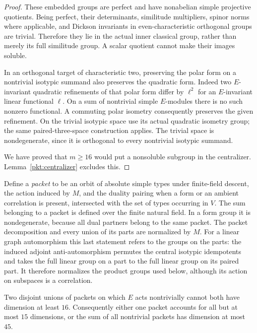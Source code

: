 \begin{proof}
These embedded groups are perfect and have nonabelian simple
projective quotients.  Being perfect, their determinants,
similitude multipliers, spinor norms where applicable, and
Dickson invariants in even-characteristic orthogonal groups
are trivial.  Therefore
they lie in the actual inner classical group, rather than
merely its full similitude group.  A scalar quotient cannot
make their images soluble.

In an orthogonal target of characteristic two, preserving the
polar form on a nontrivial isotypic summand also preserves the
quadratic form.  Indeed two $E$-invariant quadratic refinements
of that polar form differ by $\ell^2$ for an $E$-invariant linear
functional $\ell$.  On a sum of nontrivial simple $E$-modules
there is no such nonzero functional.  A commuting polar
isometry consequently preserves the given refinement.  On the
trivial isotypic space use its actual quadratic isometry group;
the same paired-three-space construction applies.  The trivial
space is nondegenerate, since it is orthogonal to every
nontrivial isotypic summand.

We have proved that $m\ge16$ would put a nonsoluble subgroup in
the centralizer.  Lemma~\ref{pkt:centralizer} excludes this.
\end{proof}

Define a \emph{packet} to be an orbit of absolute simple types
under finite-field descent, the action induced by $M$, and the
duality pairing when a form or an ambient correlation is present,
intersected with the set of types occurring in $V$.
The sum belonging to a packet is defined over the finite natural
field.  In a form group it is nondegenerate, because all dual
partners belong to the same packet.  The packet decomposition
and every union of its parts are normalized by $M$.
For a linear graph automorphism this last statement refers to
the groups on the parts: the induced adjoint anti-automorphism
permutes the central isotypic idempotents and takes the full
linear group on a part to the full linear group on its paired
part.  It therefore normalizes the product groups used below,
although its action on subspaces is a correlation.

\begin{lemma}
\label{pkt:one-packet}
Two disjoint unions of packets on which $E$ acts nontrivially
cannot both have dimension at least $16$.  Consequently either
one packet accounts for all but at most $15$ dimensions, or
the sum of all nontrivial packets has dimension at most $45$.
\end{lemma}

